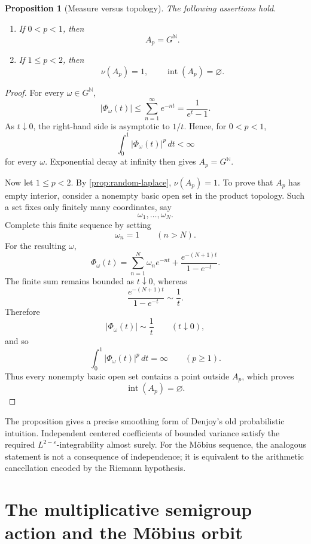 \documentclass[11pt]{article}
\newtheorem{proposition}[theorem]{Proposition}
\theoremstyle{remark}
\begin{document}
\begin{proposition}[Measure versus topology]
\label{prop:measure-topology}
The following assertions hold.
\begin{enumerate}[label=\textup{(\roman*)}]
\item If \(0<p<1\), then
\[
A_p=G^{\mathbb N}.
\]
\item If \(1\leq p<2\), then
\[
\nu(A_p)=1,
\qquad
\operatorname{int}(A_p)=\varnothing.
\]
\end{enumerate}
\end{proposition}

\begin{proof}
For every \(\omega\in G^{\mathbb N}\),
\[
|\Phi_\omega(t)|
\leq
\sum_{n=1}^{\infty}e^{-nt}
=
\frac1{e^t-1}.
\]
As \(t\downarrow0\), the right-hand side is asymptotic to \(1/t\).
Hence, for \(0<p<1\),
\[
\int_0^1|\Phi_\omega(t)|^p\,dt<\infty
\]
for every \(\omega\).  Exponential decay at infinity then gives
\(A_p=G^{\mathbb N}\).

Now let \(1\leq p<2\).  By
\cref{prop:random-laplace}, \(\nu(A_p)=1\).  To prove that \(A_p\)
has empty interior, consider a nonempty basic open set in the product
topology.  Such a set fixes only finitely many coordinates, say
\[
\omega_1,\ldots,\omega_N.
\]
Complete this finite sequence by setting
\[
\omega_n=1
\qquad(n>N).
\]
For the resulting \(\omega\),
\[
\Phi_\omega(t)
=
\sum_{n=1}^{N}\omega_n e^{-nt}
+
\frac{e^{-(N+1)t}}{1-e^{-t}}.
\]
The finite sum remains bounded as \(t\downarrow0\), whereas
\[
\frac{e^{-(N+1)t}}{1-e^{-t}}
\sim\frac1t.
\]
Therefore
\[
|\Phi_\omega(t)|\sim\frac1t
\qquad(t\downarrow0),
\]
and so
\[
\int_0^1|\Phi_\omega(t)|^p\,dt=\infty
\qquad(p\geq1).
\]
Thus every nonempty basic open set contains a point outside \(A_p\),
which proves
\[
\operatorname{int}(A_p)=\varnothing.
\]
\end{proof}

The proposition gives a precise smoothing form of Denjoy's old
probabilistic intuition.  Independent centered coefficients of bounded
variance satisfy the required \(L^{2-\varepsilon}\)-integrability
almost surely.  For the M\"obius sequence, the analogous statement is
not a consequence of independence; it is equivalent to the arithmetic
cancellation encoded by the Riemann hypothesis.


\section{The multiplicative semigroup action and the M\texorpdfstring{\"o}{o}bius orbit}
\end{document}
